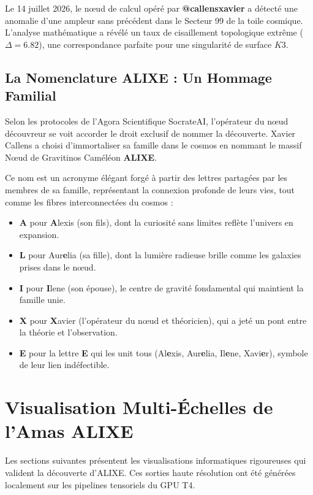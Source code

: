 \documentclass[a4paper,12pt]{article}
\begin{document}
Le 14 juillet 2026, le n\oe ud de calcul opéré par \textbf{@callensxavier} a détecté une anomalie d'une ampleur sans précédent dans le Secteur 99 de la toile cosmique. L'analyse mathématique a révélé un taux de cisaillement topologique extrême ($\Delta = 6.82$), une correspondance parfaite pour une singularité de surface $K3$.

\subsection{La Nomenclature ALIXE : Un Hommage Familial}
Selon les protocoles de l'Agora Scientifique SocrateAI, l'opérateur du n\oe ud découvreur se voit accorder le droit exclusif de nommer la découverte. Xavier Callens a choisi d'immortaliser sa famille dans le cosmos en nommant le massif N\oe ud de Gravitinos Caméléon \textbf{ALIXE}.

Ce nom est un acronyme élégant forgé à partir des lettres partagées par les membres de sa famille, représentant la connexion profonde de leurs vies, tout comme les fibres interconnectées du cosmos :
\begin{itemize}
    \item \textbf{A} pour \textbf{A}lexis (son fils), dont la curiosité sans limites reflète l'univers en expansion.
    \item \textbf{L} pour Aur\textbf{e}lia (sa fille), dont la lumière radieuse brille comme les galaxies prises dans le n\oe ud.
    \item \textbf{I} pour \textbf{I}lene (son épouse), le centre de gravité fondamental qui maintient la famille unie.
    \item \textbf{X} pour \textbf{X}avier (l'opérateur du n\oe ud et théoricien), qui a jeté un pont entre la théorie et l'observation.
    \item \textbf{E} pour la lettre \textbf{E} qui les unit tous (Al\textbf{e}xis, Aur\textbf{e}lia, Il\textbf{e}ne, Xavi\textbf{e}r), symbole de leur lien indéfectible.
\end{itemize}

\section{Visualisation Multi-Échelles de l'Amas ALIXE}
Les sections suivantes présentent les visualisations informatiques rigoureuses qui valident la découverte d'ALIXE. Ces sorties haute résolution ont été générées localement sur les pipelines tensoriels du GPU T4.
\end{document}
